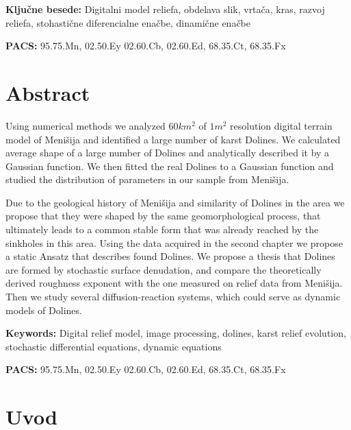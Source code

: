 \documentclass[a4paper, twoside, 12pt]{book}
\begin{document}
\vspace*{1cm}

\noindent \textbf{Ključne besede:} Digitalni model reliefa, obdelava slik, vrtača, kras, razvoj reliefa, stohastične diferencialne enačbe, dinamične enačbe
\smallskip

\noindent \textbf{PACS:} 95.75.Mn, 02.50.Ey 02.60.Cb, 02.60.Ed, 68.35.Ct, 68.35.Fx

\newpage \thispagestyle{empty}

 
\chapter*{Abstract}

  Using numerical methods we analyzed $60 km^2$ of $1m^2$ resolution digital terrain model of Menišija and identified a large number of karst Dolines. We calculated average shape of a large number of Dolines and analytically described it by a Gaussian function. We then fitted the real Dolines to a Gaussian function and studied the distribution of parameters in our sample from Menišija.

  Due to the geological history of Menišija and similarity of Dolines in the area we propose that they were shaped by the same geomorphological process, that ultimately leads to a common stable form that was already reached by the sinkholes in this area.
  Using the data acquired in the second chapter we propose a static Ansatz that describes found Dolines. We propose a thesis that Dolines are formed by stochastic surface denudation, and compare the theoretically derived roughness exponent with the one measured on relief data from Menišija. Then we study several diffusion-reaction systems, which could serve as dynamic models of Dolines.

\vspace*{1cm}

\noindent \textbf{Keywords:} Digital relief model, image processing, dolines, karst relief evolution, stochastic differential equations, dynamic equations
\smallskip

\noindent \textbf{PACS:} 95.75.Mn, 02.50.Ey 02.60.Cb, 02.60.Ed, 68.35.Ct, 68.35.Fx


\newpage \thispagestyle{empty}

\mainmatter
\setcounter{page}{1}
\pagestyle{fancy}
\rhead{\thepage}


  \chapter{Uvod}
  \label{ch:uvod}
\end{document}
